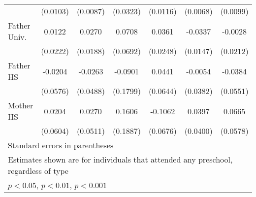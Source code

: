 \begin{table}[htbp]
\begin{tabular}{l*{6}{c}}
            &    (0.0103)         &    (0.0087)         &    (0.0323)         &    (0.0116)         &    (0.0068)         &    (0.0099)         \\
\addlinespace
Father Univ.&      0.0122         &      0.0270         &      0.0708         &      0.0361         &     -0.0337\sym{*}  &     -0.0028         \\
            &    (0.0222)         &    (0.0188)         &    (0.0692)         &    (0.0248)         &    (0.0147)         &    (0.0212)         \\
\addlinespace
Father HS   &     -0.0204         &     -0.0263         &     -0.0901         &      0.0441         &     -0.0054         &     -0.0384         \\
            &    (0.0576)         &    (0.0488)         &    (0.1799)         &    (0.0644)         &    (0.0382)         &    (0.0551)         \\
\addlinespace
Mother HS   &      0.0204         &      0.0270         &      0.1606         &     -0.1062         &      0.0397         &      0.0665         \\
            &    (0.0604)         &    (0.0511)         &    (0.1887)         &    (0.0676)         &    (0.0400)         &    (0.0578)         \\
\bottomrule
\multicolumn{7}{l}{\footnotesize Standard errors in parentheses}\\
\multicolumn{7}{l}{\footnotesize Estimates shown are for individuals that attended any preschool, regardless of type}\\
\multicolumn{7}{l}{\footnotesize \sym{*} \(p<0.05\), \sym{**} \(p<0.01\), \sym{***} \(p<0.001\)}\\
\end{tabular}
\end{table}
